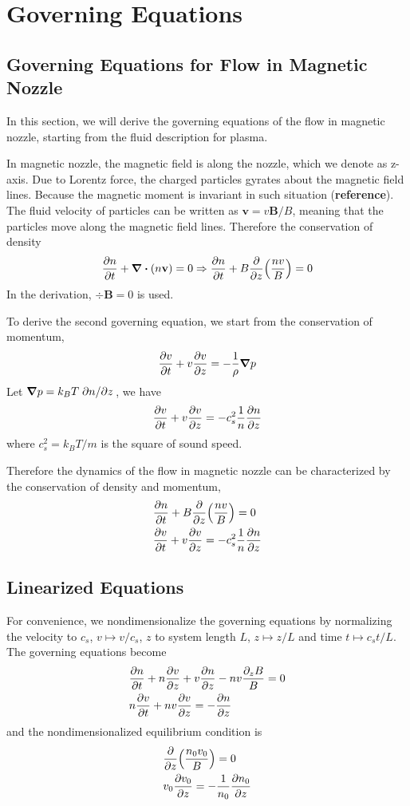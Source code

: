 \chapter{Governing Equations}
\section{Governing Equations for Flow in Magnetic Nozzle}
In this section, we will derive the governing equations of the flow in magnetic nozzle, starting from the fluid description for plasma.

In magnetic nozzle, the magnetic field is along the nozzle, which we denote as z-axis. Due to Lorentz force, the charged particles gyrates about the magnetic field lines. Because the magnetic moment is invariant in such situation (\textbf{reference}). The fluid velocity of particles can be written as $\mathbf{v} = v\mathbf{B}/B$, meaning that the particles move along the magnetic field lines. Therefore the conservation of density 
\[ 
\pdv{n}{t} + \div(n\mathbf{v}) = 0 
\Rightarrow 
\pdv{n}{t} + B\pdv{z}(\frac{nv}{B}) = 0  
\]
In the derivation, $\div{\mathbf{B}} = 0$ is used.

To derive the second governing equation, we start from the conservation of momentum, 
\[ \pdv{v}{t} + v\pdv{v}{z} = -\frac{1}{\rho}\grad{p} \]
Let $\grad{p} = k_BT\pdv*{n}{z}$, we have
\[ \pdv{v}{t} + v\pdv{v}{z} = -c_s^2\frac{1}{n}\pdv{n}{z} \]
where $c_s^2 = k_BT/m$ is the square of sound speed.

Therefore the dynamics of the flow in magnetic nozzle can be characterized by the conservation of density and momentum,
\begin{align*}
	&\pdv{n}{t} + B\pdv{z}(\frac{nv}{B}) = 0\\
	&\pdv{v}{t} + v\pdv{v}{z} = -c_s^2\frac{1}{n}\pdv{n}{z}
\end{align*}

\section{Linearized Equations}
For convenience, we nondimensionalize the governing equations by normalizing the velocity to $c_s$, $v\mapsto v/c_s$, $z$ to system length $L$, $z \mapsto z/L$ and time $t\mapsto c_s t/L$. The governing equations become
\begin{align}
    &\pdv{n}{t} + n\pdv{v}{z} + v\pdv{n}{z} - nv\frac{\partial_z B}{B} = 0 \\
    &n\pdv{v}{t} + nv\pdv{v}{z} = -\pdv{n}{z}
\end{align}
and the nondimensionalized equilibrium condition is
\begin{align}
    &\pdv{z}(\frac{n_0v_0}{B}) = 0 \label{eq:equilibrium-convervation-of-mass}\\
    &v_0\pdv{v_0}{z} = -\frac{1}{n_0}\pdv{n_0}{z} \label{eq:equilibrium-convervation-of-momentum}
\end{align}


